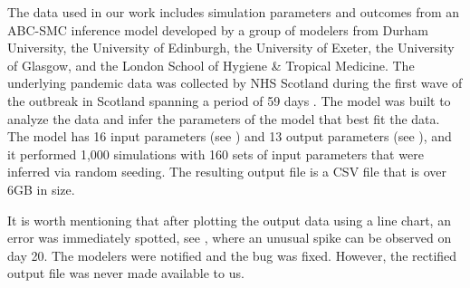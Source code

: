 The data used in our work includes simulation parameters and outcomes from an \ac{ABC-SMC} inference model \cite{toni2008Approximate} developed by a group of modelers from Durham University, the University of Edinburgh, the University of Exeter, the University of Glasgow, and the London School of Hygiene \& Tropical Medicine.
The underlying pandemic data was collected by NHS Scotland during the first wave of the outbreak in Scotland spanning a period of 59 days \cite{2020Covid19}.
The model was built to analyze the data and infer the parameters of the model that best fit the data.
The model has 16 input parameters (see ) and 13 output parameters (see ), and it performed 1,000 simulations with 160 sets of input parameters that were inferred via random seeding.
The resulting output file is a CSV file that is over 6GB in size.

It is worth mentioning that after plotting the output data using a line chart, an error was immediately spotted, see , where an unusual spike can be observed on day 20.
The modelers were notified and the bug was fixed.
However, the rectified output file was never made available to us.
